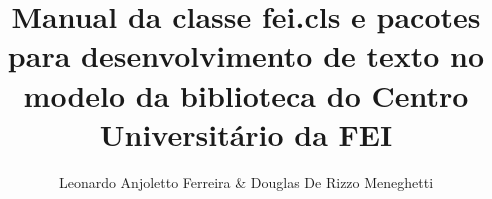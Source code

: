\documentclass{fei}
\begin{document}
\author{Leonardo Anjoletto Ferreira \& Douglas De Rizzo Meneghetti}
\title{Manual da classe fei.cls e pacotes para desenvolvimento de texto no modelo da biblioteca do Centro Universitário da FEI}

\maketitle
\sumario





\end{document}
